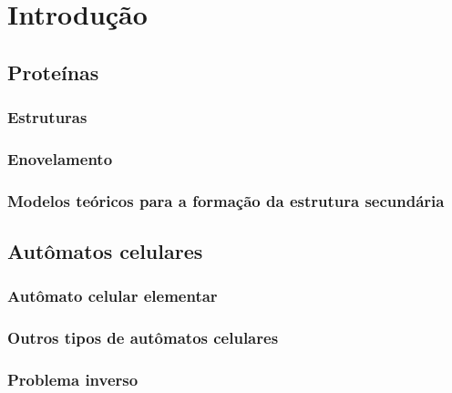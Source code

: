 \chapter{Introdução}\label{ch:introducao}

\section{Proteínas}

\subsection{Estruturas}

\subsection{Enovelamento}

\subsection{Modelos teóricos para a formação da estrutura secundária}


\section{Autômatos celulares}

\subsection{Autômato celular elementar}

\subsection{Outros tipos de autômatos celulares}

\subsection{Problema inverso}
